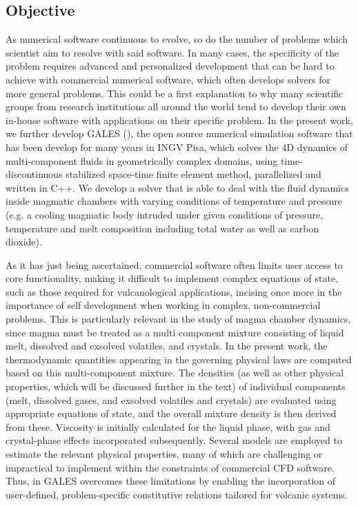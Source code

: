 \subsection{Objective}
As numerical software continuous to evolve, so do the number of problems which scientist aim to resolve with said software. In many cases, the specificity of the problem requires advanced and personalized development that can be hard to achieve with commercial numerical software, which often develops solvers for more general problems. This could be a first explanation to why many scientific groups from research institutions all around the world tend to develop their own in-house software with applications on their specific problem. In the present work, we further develop GALES (\cite{garg2022}), the open source numerical simulation software that has been develop for many years in INGV Pisa, which solves the 4D dynamics of multi-component fluids in geometrically complex domains, using time-discontinuous stabilized space-time finite element method, parallelized and written in C++. We develop a solver that is able to deal with the fluid dynamics inside magmatic chambers with varying conditions of temperature and pressure (e.g. a cooling magmatic body intruded under given conditions of pressure, temperature and melt composition including total water as well as carbon dioxide).

As it has just being ascertained, commercial software often limits user access to core functionality, making it difficult to implement complex equations of state, such as those required for vulcanological applications, incising once more in the importance of self development when working in complex, non-commercial problems. This is particularly relevant in the study of magma chamber dynamics, since magma must be treated as a multi component mixture consisting of liquid melt, dissolved and exsolved volatiles, and crystals. In the present work, the  thermodynamic quantities appearing in the governing physical laws are computed based on this multi-component mixture. The densities (as well as other physical properties, which will be discussed further in the text) of individual components (melt, dissolved gases, and exsolved volatiles and crystals) are evaluated using appropriate equations of state, and the overall mixture density is then derived from these. Viscosity is initially calculated for the liquid phase, with gas and crystal-phase effects incorporated subsequently. Several models are employed to estimate the relevant physical properties, many of which are challenging or impractical to implement within the constraints of commercial CFD software. Thus, in GALES overcomes these limitations by enabling the incorporation of user-defined, problem-specific constitutive relations tailored for volcanic systems. 

